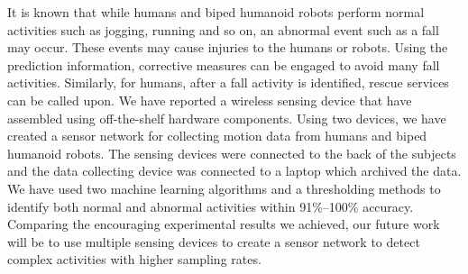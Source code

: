 \documentclass[letterpaper]{article}
\begin{document}
\begin{sloppy}
It is known that while humans and biped humanoid robots perform normal activities such as jogging, 
running and so on, an abnormal event such as a fall may occur. These events may cause injuries 
 to the humans or robots. 
  Using the prediction information, corrective measures can be engaged to avoid 
 many fall activities. Similarly, for humans, after  a fall activity is identified, rescue services 
 can be called upon. We have reported a wireless sensing device that have assembled using 
off-the-shelf hardware components. Using two devices, we have created a sensor network for 
collecting motion data from humans and biped humanoid robots. The sensing devices were connected to 
the back of the subjects and the data collecting device was connected to a laptop which archived 
the data. We have used two machine learning algorithms and a thresholding methods to 
identify both normal and abnormal activities within 91\%--100\% accuracy. Comparing the encouraging 
experimental results we achieved, our future work will be to use multiple sensing devices to create 
a sensor network to detect complex activities with higher sampling rates.  




\end{sloppy}
\end{document}
